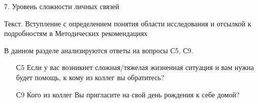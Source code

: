 \begin{frame}{7. Уровень сложности личных связей }

\tiny
Текст. Вступление с определением понятия области исследования и отсылкой к подробностям в Методических рекомендациях

В данном разделе анализируются ответы на вопросы С5, С9.
\bigskip

\begin{itemize}

\item [С5] Если у вас возникнет сложная/тяжелая жизненная ситуация и вам нужна будет помощь, к кому из коллег вы обратитесь?

\item [С9] Кого из коллег Вы пригласите на свой день рождения к себе домой?

\end{itemize}
\end{frame}


